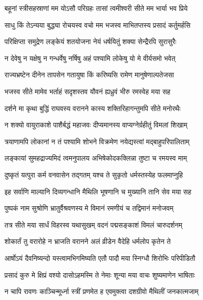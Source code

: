 \twolineshloka
{बहूनां स्त्रीसहस्राणां मम योऽसौ परिग्रहः}
{तासां त्वमीश्वरी सीते मम भार्या भव प्रिये} %

\twolineshloka
{साधु किं तेऽन्यया बुद्ध्या रोचयस्व वचो मम}
{भजस्व माभितप्तस्य प्रसादं कर्तुमर्हसि} %

\twolineshloka
{परिक्षिप्ता समुद्रेण लङ्केयं शतयोजना}
{नेयं धर्षयितुं शक्या सेन्द्रैरपि सुरासुरैः} %

\twolineshloka
{न देवेषु न यक्षेषु न गन्धर्वेषु नर्षिषु}
{अहं पश्यामि लोकेषु यो मे वीर्यसमो भवेत्} %

\twolineshloka
{राज्यभ्रष्टेन दीनेन तापसेन गतायुषा}
{किं करिष्यसि रामेण मानुषेणाल्पतेजसा} %

\twolineshloka
{भजस्व सीते मामेव भर्ताहं सदृशस्तव}
{यौवनं ह्यध्रुवं भीरु रमस्वेह मया सह} %

\twolineshloka
{दर्शने मा कृथा बुद्धिं राघवस्य वरानने}
{कास्य शक्तिरिहागन्तुमपि सीते मनोरथैः} %

\twolineshloka
{न शक्यो वायुराकाशे पाशैर्बद्धं महाजवः}
{दीप्यमानस्य वाप्यग्नेर्ग्रहीतुं विमलां शिखाम्} %

\twolineshloka
{त्रयाणामपि लोकानां न तं पश्यामि शोभने}
{विक्रमेण नयेद्यस्त्वां मद्बाहुपरिपालिताम्} %

\twolineshloka
{लङ्कायां सुमहद्राज्यमिदं त्वमनुपालय}
{अभिषेकोदकक्लिन्ना तुष्टा च रमयस्व माम्} %

\twolineshloka
{दुष्कृतं यत्पुरा कर्म वनवासेन तद्गतम्}
{यश्च ते सुकृतो धर्मस्तस्येह फलमाप्नुहि} %

\twolineshloka
{इह सर्वाणि माल्यानि दिव्यगन्धानि मैथिलि}
{भूषणानि च मुख्यानि तानि सेव मया सह} %

\twolineshloka
{पुष्पकं नाम सुश्रोणि भ्रातुर्वैश्रवणस्य मे}
{विमानं रमणीयं च तद्विमानं मनोजवम्} %

\twolineshloka
{तत्र सीते मया सार्धं विहरस्व यथासुखम्}
{वदनं पद्मसङ्काशं विमलं चारुदर्शनम्} %

\twolineshloka
{शोकार्तं तु वरारोहे न भ्राजति वरानने}
{अलं व्रीडेन वैदेहि धर्मलोप कृतेन ते} %

\twolineshloka
{आर्षोऽयं दैवनिष्यन्दो यस्त्वामभिगमिष्यति}
{एतौ पादौ मया स्निग्धौ शिरोभिः परिपीडितौ} %

\twolineshloka
{प्रसादं कुरु मे क्षिप्रं वश्यो दासोऽहमस्मि ते}
{नेमाः शून्या मया वाचः शुष्यमाणेन भाषिताः} %

\twolineshloka
{न चापि रावणः काञ्चिन्मूर्ध्ना स्त्रीं प्रणमेत ह}
{एवमुक्त्वा दशग्रीवो मैथिलीं जनकात्मजाम्} %

